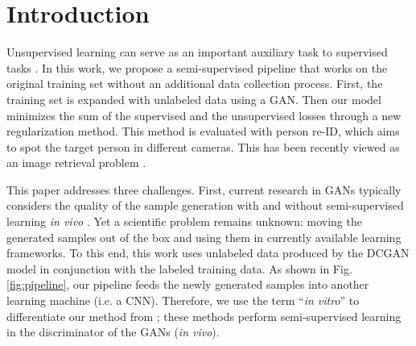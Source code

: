 \documentclass[10pt,twocolumn,letterpaper]{article}
\begin{document}
\section{Introduction}
Unsupervised learning can serve as an important auxiliary task to supervised tasks \cite{hinton2006reducing,rasmus2015semi,goodfellow2013multi,ranzato2008semi}. In this work, we propose a semi-supervised pipeline that works on the original training set without an additional data collection process. First, the training set is expanded with unlabeled data using a GAN. Then our model minimizes the sum of the supervised and the unsupervised losses through a new regularization method. This method is evaluated with person re-ID, which aims to spot the target person in different cameras. This has been recently viewed as an image retrieval problem \cite{zheng2016survey}. 


This paper addresses three challenges. First, current research in GANs typically considers the quality of the sample generation with and without semi-supervised learning \emph{in vivo} \cite{odena2016semi,salimans2016improved,radford2015unsupervised,chen2016infogan,pathak2016context,wu2016learning}. Yet a scientific problem remains unknown: moving the generated samples out of the box and using them in currently available learning frameworks. To this end, this work uses unlabeled data produced by the DCGAN model \cite{radford2015unsupervised} in conjunction with the labeled training data. As shown in Fig. \ref{fig:pipeline}, our pipeline feeds the newly generated samples into another learning machine (i.e. a CNN). Therefore, we use the term ``\emph{in vitro}'' to differentiate our method from \cite{odena2016semi,salimans2016improved,radford2015unsupervised,chen2016infogan}; these methods perform semi-supervised learning in the discriminator of the GANs (\emph{in vivo}).
\end{document}
